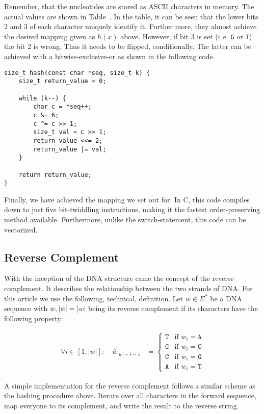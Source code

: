 \documentclass[10pt,letterpaper]{article}
\begin{document}
Remember, that the nucleotides are stored as ASCII characters in memory. The actual values are shown in Table~{}. In the table, it can be seen that the lower bits 2 and 3 of each character uniquely identify it. Further more, they almost achieve the desired mapping given as $h(x)$ above. However, if bit 3 is set (i.\,e. \lstinline!G! or \lstinline!T!) the bit 2 is wrong. Thus it needs to be flipped, conditionally. The latter can be achieved with a bitwise-exclusive-or as shown in the following code.

\begin{lstlisting}
size_t hash(const char *seq, size_t k) {  
    size_t return_value = 0;

    while (k--) {
    	char c = *seq++;
    	c &= 6;
    	c ^= c >> 1;
    	size_t val = c >> 1;
    	return_value <<= 2;
    	return_value |= val;
    }

    return return_value;
}
\end{lstlisting}

Finally, we have achieved the mapping we set out for. In C, this code compiles down to just five bit-twiddling instructions, making it the fastest order-preserving method available. Furthermore, unlike the switch-statement, this code can be vectorized.


\subsection*{Reverse Complement}

With the inception of the DNA structure came the concept of the reverse complement. It describes the relationship between the two strands of DNA. For this article we use the following, technical, definition. Let $w\in \Sigma^*$ be a DNA sequence with $\bar w, |\bar w| = |w|$ being its reverse complement if its characters have the following property:

\begin{align*}
	\forall i\in[1,|w|]\colon \quad {\bar w}_{|w|-i-1} &=
		\begin{cases}
			\texttt{T} & \text{if } w_i = \texttt{A} \\
			\texttt{G} & \text{if } w_i = \texttt{C} \\
			\texttt{C} & \text{if } w_i = \texttt{G} \\
			\texttt{A} & \text{if } w_i = \texttt{T}
		\end{cases}
\end{align*}

A simple implementation for the reverse complement follows a similar scheme as the hashing procedure above. Iterate over all characters in the forward sequence, map everyone to its complement, and write the result to the reverse string.
\end{document}
